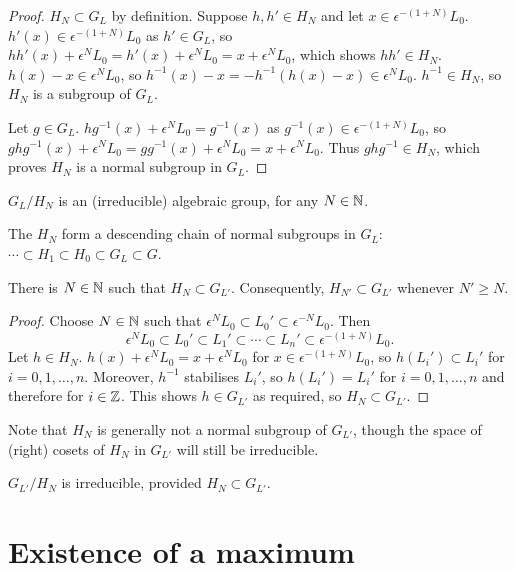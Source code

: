 \documentclass[a4paper, 11pt]{report}
\begin{document}
\begin{proof}
$H_N\subset G_L$ by definition. Suppose $h,h'\in H_N$ and let $x\in\epsilon^{-(1+N)}L_0$. $h'(x)\in\epsilon^{-(1+N)}L_0$ as $h'\in G_L$, so $hh'(x) + \epsilon^N L_0 = h'(x) + \epsilon^N L_0 = x + \epsilon^N L_0$, which shows $hh'\in H_N$. $h(x)-x\in\epsilon^N L_0$, so $h^{-1}(x) - x = -h^{-1}(h(x)-x)\in\epsilon^N L_0$. $h^{-1}\in H_N$, so $H_N$ is a subgroup of $G_L$.

Let $g\in G_L$. $hg^{-1}(x) + \epsilon^N L_0 = g^{-1}(x)$ as $g^{-1}(x)\in\epsilon^{-(1+N)}L_0$, so $ghg^{-1}(x) + \epsilon^N L_0 = gg^{-1}(x) + \epsilon^N L_0 = x + \epsilon^N L_0$. Thus $ghg^{-1}\in H_N$, which proves $H_N$ is a normal subgroup in $G_L$.
\end{proof}

\begin{lemma}
$G_L/H_N$ is an (irreducible) algebraic group, for any $N\in\mathbb{N}$.
\end{lemma}

The $H_N$ form a descending chain of normal subgroups in $G_L$: $\cdots\subset H_1 \subset H_0 \subset G_L \subset G$.

\begin{lemma}
There is $N\in\mathbb{N}$ such that $H_N\subset G_{L'}$. Consequently, $H_{N'}\subset G_{L'}$ whenever $N'\geq N$.
\end{lemma}
\begin{proof}
Choose $N\in\mathbb{N}$ such that $\epsilon^N L_0\subset L_0'\subset \epsilon^{-N}L_0$. Then
\begin{equation*}
\epsilon^N L_0 \subset L_0'\subset L_1'\subset\cdots\subset L_n' \subset \epsilon^{-(1+N)}L_0.
\end{equation*}
Let $h\in H_N$. $h(x) + \epsilon^N L_0 = x + \epsilon^N L_0$ for $x\in\epsilon^{-(1+N)} L_0$, so $h(L_i')\subset L_i'$ for $i=0,1,\ldots,n$. Moreover, $h^{-1}$ stabilises $L_i'$, so $h(L_i') = L_i'$ for $i=0,1,\ldots,n$ and therefore for $i\in\mathbb{Z}$. This shows $h\in G_{L'}$ as required, so $H_N\subset G_{L'}$.
\end{proof}

Note that $H_N$ is generally not a normal subgroup of $G_{L'}$, though the space of (right) cosets of $H_N$ in $G_{L'}$ will still be irreducible.

\begin{lemma}
$G_{L'}/H_N$ is irreducible, provided $H_N\subset G_{L'}$.
\end{lemma}

\section{Existence of a maximum}
\end{document}
